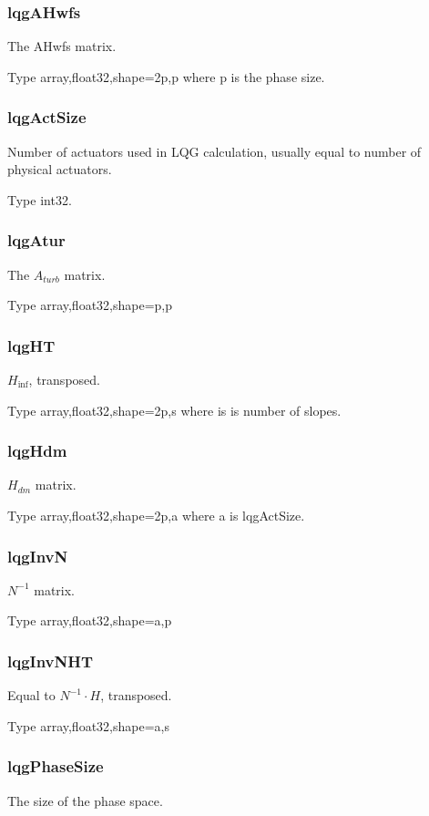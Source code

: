 \documentclass[a4,10pt]{article}
\begin{document}
\subsubsection{lqgAHwfs}
The AHwfs matrix.

Type array,float32,shape=2p,p where p is the phase size.

\subsubsection{lqgActSize}
Number of actuators used in LQG calculation, usually equal to number
of physical actuators.

Type int32.

\subsubsection{lqgAtur}
The $A_{turb}$ matrix.

Type array,float32,shape=p,p

\subsubsection{lqgHT}
$H_{\inf}$, transposed.

Type array,float32,shape=2p,s where is is number of slopes.

\subsubsection{lqgHdm}
$H_{dm}$ matrix.

Type array,float32,shape=2p,a where a is lqgActSize.

\subsubsection{lqgInvN}
$N^{-1}$ matrix.

Type array,float32,shape=a,p

\subsubsection{lqgInvNHT}
Equal to $N^{-1}\cdot H$, transposed.

Type array,float32,shape=a,s

\subsubsection{lqgPhaseSize}
The size of the phase space.
\end{document}
